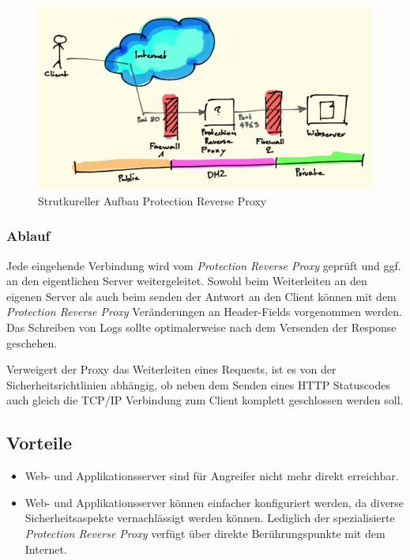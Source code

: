 \begin{figure}[H]
	\centering
	\includegraphics[width=12cm]{content/security/secure-internet-applications/images/protection-reverse-proxy.png}
	\caption{Strutkureller Aufbau Protection Reverse Proxy}
\end{figure}

\subsubsection*{Ablauf}
Jede eingehende Verbindung wird vom \emph{Protection Reverse Proxy} geprüft und ggf. an den eigentlichen Server weitergeleitet. Sowohl beim Weiterleiten an den eigenen Server als auch beim senden der Antwort an den Client können mit dem \emph{Protection Reverse Proxy} Veränderungen an Header-Fields vorgenommen werden. Das Schreiben von Logs sollte optimalerweise nach dem Versenden der Response geschehen.

Verweigert der Proxy das Weiterleiten eines Requests, ist es von der Sicherheitsrichtlinien abhängig, ob neben dem Senden eines HTTP Statuscodes auch gleich die TCP/IP Verbindung zum Client komplett geschlossen werden soll.

\subsection*{Vorteile}
\begin{itemize}
	\item Web- und Applikationsserver sind für Angreifer nicht mehr direkt erreichbar.
	\item Web- und Applikationsserver können einfacher konfiguriert werden, da diverse Sicherheitsaspekte vernachlässigt werden können. Lediglich der spezialisierte \emph{Protection Reverse Proxy} verfügt über direkte Berührungspunkte mit dem Internet.
\end{itemize}

